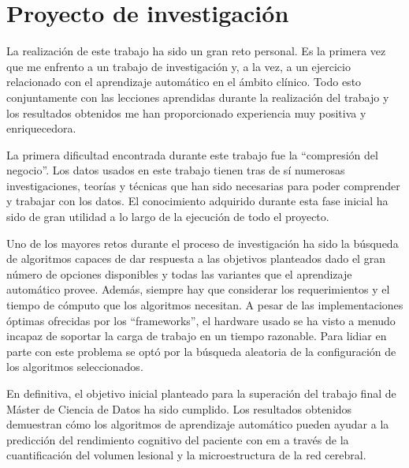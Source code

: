 \section{Proyecto de investigación}
La realización de este trabajo ha sido un gran reto personal. Es la primera vez que me enfrento a un trabajo de investigación y, a la vez, a un ejercicio relacionado con el aprendizaje automático en el ámbito clínico. Todo esto conjuntamente con las lecciones aprendidas durante la realización del trabajo y los resultados obtenidos me han proporcionado experiencia muy positiva y enriquecedora.

La primera dificultad encontrada durante este trabajo fue la ``compresión del negocio''. Los datos usados en este trabajo tienen tras de sí numerosas investigaciones, teorías y técnicas que han sido necesarias para poder comprender y trabajar con los datos. El conocimiento adquirido durante esta fase inicial ha sido de gran utilidad a lo largo de la ejecución de todo el proyecto.

Uno de los mayores retos durante el proceso de investigación ha sido la búsqueda de algoritmos capaces de dar respuesta a las objetivos planteados dado el gran número de opciones disponibles y todas las variantes que el aprendizaje automático provee. Además, siempre hay que considerar los requerimientos y el tiempo de cómputo que los algoritmos necesitan. A pesar de las implementaciones óptimas ofrecidas por los  ``frameworks'', el hardware usado se ha visto a menudo incapaz de soportar la carga de trabajo en un tiempo razonable. Para lidiar en parte con este problema se optó por la búsqueda aleatoria de la configuración de los algoritmos seleccionados. 

En definitiva, el objetivo inicial planteado para la superación del trabajo final de Máster de Ciencia de Datos ha sido cumplido. Los resultados obtenidos demuestran  cómo los algoritmos de aprendizaje automático pueden ayudar a la predicción del rendimiento cognitivo del paciente con \gls{em} a través de la cuantificación del volumen lesional y la microestructura de la red cerebral.
